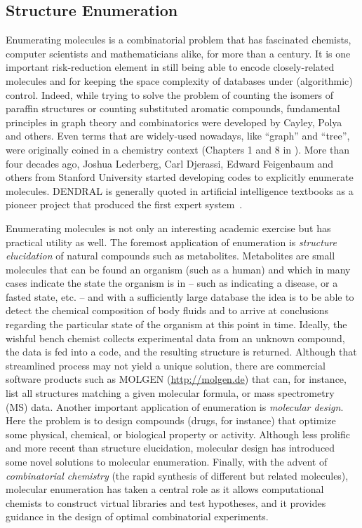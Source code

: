 \documentclass{sig-alternate}
\begin{document}
\subsection{Structure Enumeration}
\label{sec:struct-enum}

Enumerating molecules is a combinatorial problem that has fascinated
chemists, computer scientists and mathematicians alike, for more than
a century. It is one important risk-reduction element in still being
able to encode closely-related molecules and for keeping the space
complexity of databases under (algorithmic) control. Indeed, while
trying to solve the problem of counting the isomers of paraffin
structures or counting substituted aromatic compounds, fundamental
principles in graph theory and combinatorics were developed by Cayley,
Polya and others. Even terms that are widely-used nowadays, like
``graph'' and ``tree'', were originally coined in a chemistry context
(Chapters 1 and 8 in \cite{faulon2010}). More than four decades ago,
Joshua Lederberg, Carl Djerassi, Edward Feigenbaum and others from
Stanford University started developing codes to explicitly enumerate
molecules. DENDRAL is generally quoted in artificial intelligence
textbooks as a pioneer project that produced the first expert
system~\cite{DENDRAL}. 

Enumerating molecules is not only an interesting academic exercise but
has practical utility as well. The foremost application of enumeration
is \emph{structure elucidation} of natural compounds such as
metabolites. Metabolites are small molecules that can be found an
organism (such as a human) and which in many cases indicate the state
the organism is in -- such as indicating a disease, or a fasted state,
etc. -- and with a sufficiently large database the idea is to be able
to detect the chemical composition of body fluids and to arrive at
conclusions regarding the particular state of the organism at this
point in time.  Ideally, the wishful bench chemist collects
experimental data from an unknown compound, the data is fed into a
code, and the resulting structure is returned. Although that
streamlined process may not yield a unique solution, there are
commercial software products such as MOLGEN (\url{http://molgen.de})
that can, for instance, list all structures matching a given molecular
formula, or mass spectrometry (MS) data. Another important application
of enumeration is \emph{molecular design}. Here the problem is to
design compounds (drugs, for instance) that optimize some physical,
chemical, or biological property or activity. Although less prolific
and more recent than structure elucidation, molecular design has
introduced some novel solutions to molecular enumeration. Finally,
with the advent of \emph{combinatorial chemistry} (the rapid synthesis
of different but related molecules), molecular enumeration has taken a
central role as it allows computational chemists to construct virtual
libraries and test hypotheses, and it provides guidance in the design
of optimal combinatorial experiments.
\end{document}
